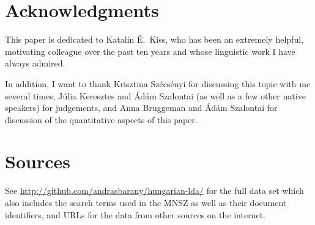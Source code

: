 \section*{Acknowledgments}

This paper is dedicated to Katalin É.\ Kiss, who has been an extremely helpful,
motivating colleague over the past ten years and whose linguistic work I have
always admired.

In addition, I want to thank Krisztina Szécsényi for discussing this topic with
me several times, Júlia Keresztes and Ádám Szalontai (as well as a few other
native speakers) for judgements, and Anna Bruggeman and Ádám Szalontai for
discussion of the quantitative aspects of this paper.

\newrefcontext[sorting=nyt]
\printbibliography

\appendix

\section{Sources}\label{app:sources}

See \url{http://github.com/andrasbarany/hungarian-lda/} for the full data set
which also includes the search terms used in the \gls{MNSZ} as well as their
document identifiers, and URLs for the data from other sources on the internet.

